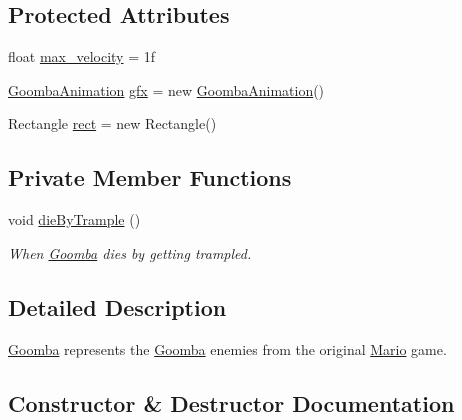 \subsection*{Protected Attributes}
\begin{DoxyCompactItemize}
\item 
float \hyperlink{classnl_1_1arjanfrans_1_1mario_1_1model_1_1Goomba_a8cc5010ce400234e91ec1c13be0d8421}{max\+\_\+velocity} = 1f
\item 
\hyperlink{classnl_1_1arjanfrans_1_1mario_1_1graphics_1_1GoombaAnimation}{Goomba\+Animation} \hyperlink{classnl_1_1arjanfrans_1_1mario_1_1model_1_1Goomba_a936ff77c12f392ca3bf555f49b850e9e}{gfx} = new \hyperlink{classnl_1_1arjanfrans_1_1mario_1_1graphics_1_1GoombaAnimation}{Goomba\+Animation}()
\item 
Rectangle \hyperlink{classnl_1_1arjanfrans_1_1mario_1_1model_1_1Goomba_af4a69ae09f56588a52ee32b7228c21f6}{rect} = new Rectangle()
\end{DoxyCompactItemize}
\subsection*{Private Member Functions}
\begin{DoxyCompactItemize}
\item 
void \hyperlink{classnl_1_1arjanfrans_1_1mario_1_1model_1_1Goomba_a307cf941d782f3a0c2734eb56c1165da}{die\+By\+Trample} ()
\begin{DoxyCompactList}\small\item\em When \hyperlink{classnl_1_1arjanfrans_1_1mario_1_1model_1_1Goomba}{Goomba} dies by getting trampled. \end{DoxyCompactList}\end{DoxyCompactItemize}


\subsection{Detailed Description}
\hyperlink{classnl_1_1arjanfrans_1_1mario_1_1model_1_1Goomba}{Goomba} represents the \hyperlink{classnl_1_1arjanfrans_1_1mario_1_1model_1_1Goomba}{Goomba} enemies from the original \hyperlink{classnl_1_1arjanfrans_1_1mario_1_1model_1_1Mario}{Mario} game. 

\subsection{Constructor \& Destructor Documentation}
\mbox{\label{classnl_1_1arjanfrans_1_1mario_1_1model_1_1Goomba_a71ffe3210dc6f4cfb0ea89ef714d5b2c}} 
